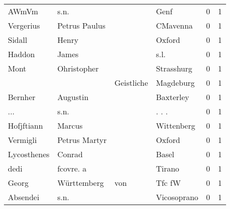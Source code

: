 \documentclass[10pt,a4paper,landscape]{article}
\begin{document}
\begin{longtable}{llllrr}
                    AWmVm &                               s.n. &             &                                        Genf &          0 &         1 \\
                Vergerius &                      Petrus Paulus &             &                                    CMavenna &          0 &         1 \\
                   Sidall &                              Henry &             &                                      Oxford &          0 &         1 \\
                   Haddon &                              James &             &                                        s.l. &          0 &         1 \\
                     Mont &                        Ohristopher &             &                                  Strasshurg &          0 &         1 \\
                          &                                    &  Geistliche &                                   Magdeburg &          0 &         1 \\
                  Bernher &                           Augustin &             &                                   Baxterley &          0 &         1 \\
                      ... &                               s.n. &             &                                      . . .  &          0 &         1 \\
               Hofjftiann &                             Marcus &             &                                  Wittenberg &          0 &         1 \\
                 Vermigli &                      Petrus Martyr &             &                                      Oxford &          0 &         1 \\
              Lycosthenes &                             Conrad &             &                                       Basel &          0 &         1 \\
                     dedi &                          fcovre. a &             &                                      Tirano &          0 &         1 \\
                    Georg &                        Württemberg &         von &                                      Tfc fW &          0 &         1 \\
                 Absendei &                               s.n. &             &                                 Vicosoprano &          0 &         1 \\

\end{longtable}
\end{document}
